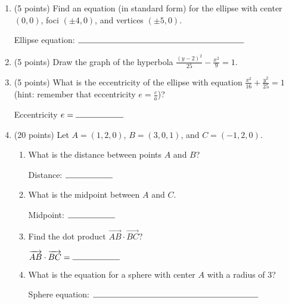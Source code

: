 \documentclass[11pt]{article}
\begin{document}
\begin{enumerate}
\newpage

\item (5 points) Find an equation (in standard form) for the ellipse with center $(0,0)$, foci $(\pm 4, 0)$, and vertices $(\pm 5,0)$.
\vspace{100pt}
\begin{flushright}
Ellipse equation: $\rule{7cm}{0.4pt}$
\end{flushright}

\vspace{10pt}

\item (5 points) Draw the graph of the hyperbola $\displaystyle \frac{(y-2)^2}{25} - \frac{x^2}{9} = 1$.

\begin{center}
\end{center}


\item (5 points) What is the eccentricity of the ellipse with equation $\frac{x^2}{16} + \frac{y^2}{25} = 1$ (hint: remember that eccentricity $e = \frac{c}{a}$)?
\vspace{100pt}
\begin{flushright}
Eccentricity $e = \rule{2cm}{0.4pt}$
\end{flushright}

\newpage

\item (20 points) Let $A = (1, 2, 0)$, $B = (3, 0, 1)$, and $C = (-1, 2, 0)$. 
\begin{enumerate}[itemsep=10pt, label={\alph*)}]
    \item What is the distance between points $A$ and $B$?
\vspace{100pt}
\begin{flushright}
Distance: $\rule{2cm}{0.4pt}$
\end{flushright}
    \item What is the midpoint between $A$ and $C$.
\vspace{100pt}
\begin{flushright}
Midpoint: $\rule{2cm}{0.4pt}$
\end{flushright}
    \item Find the dot product $\overrightarrow{AB} \cdot \overrightarrow{BC}$?
\vspace{100pt}
\begin{flushright}
$\overrightarrow{AB} \cdot \overrightarrow{BC} = \rule{2cm}{0.4pt}$
\end{flushright}
    \item What is the equation for a sphere with center $A$ with a radius of 3?
\vspace{100pt}
\begin{flushright}
Sphere equation: $\rule{7cm}{0.4pt}$
\end{flushright}
\end{enumerate}


\end{enumerate}
\end{document}
